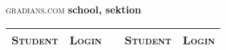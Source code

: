 \documentclass{tufte-handout}
\begin{document}
  \begin{fullwidth}
    \begin{flushleft}
      \huge \textsc{gradians.com}
      \quad \quad \LARGE \textbf{school, sektion}
    \end{flushleft}
    \begin{table}
      \begin{tabular}{llcll}
        \toprule
          \textsc{Student} & \textsc{Login} & \hspace{2cm} & \textsc{Student} & \textsc{Login} \\
        \midrule
      \end{tabular}
    \end{table}
  \end{fullwidth}
\end{document}
